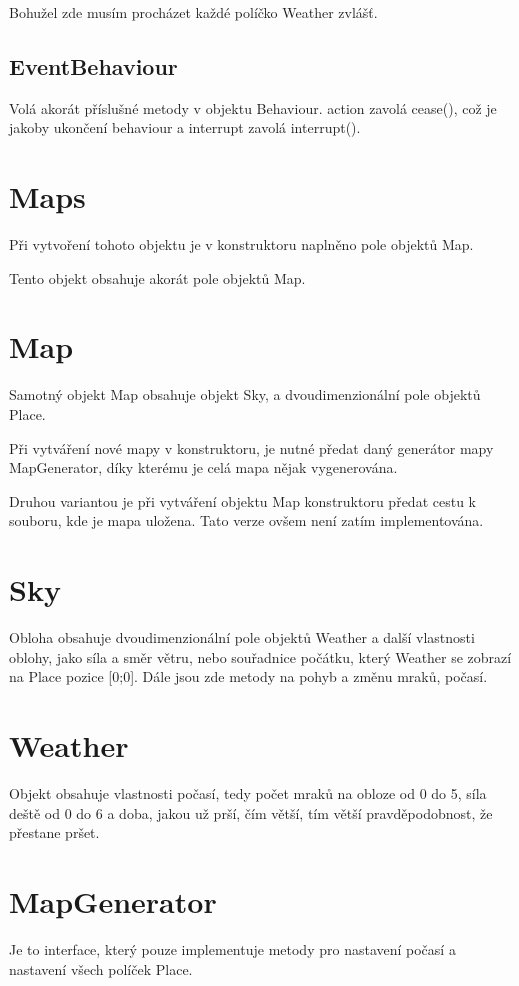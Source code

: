 \documentclass[12pt,a4paper]{report}
\begin{document}
Bohužel zde musím procházet každé políčko Weather zvlášť.

\subsection{EventBehaviour}
Volá akorát příslušné metody v objektu Behaviour. action zavolá cease(), což je jakoby ukončení behaviour a interrupt zavolá interrupt().


\section{Maps}
Při vytvoření tohoto objektu je v konstruktoru naplněno pole objektů Map.

Tento objekt obsahuje akorát pole objektů Map.

\section{Map}
 Samotný objekt Map obsahuje objekt Sky, a dvoudimenzionální pole objektů Place.  

Při vytváření nové mapy v konstruktoru, je nutné předat daný generátor mapy MapGenerator, díky kterému je celá mapa nějak vygenerována.

Druhou variantou je při vytváření objektu Map konstruktoru předat cestu k souboru, kde je mapa uložena. Tato verze ovšem není zatím implementována.
 
\section{Sky}
Obloha obsahuje dvoudimenzionální pole objektů Weather a další vlastnosti oblohy, jako síla a směr větru, nebo souřadnice počátku, který Weather se zobrazí na Place pozice [0;0]. Dále jsou zde metody na pohyb a změnu mraků, počasí.

\section{Weather}
Objekt obsahuje vlastnosti počasí, tedy počet mraků na obloze od 0 do 5, síla deště od 0 do 6 a doba, jakou už prší, čím větší, tím větší pravděpodobnost, že přestane pršet.

\section{MapGenerator}
Je to interface, který pouze implementuje metody pro nastavení počasí a nastavení všech políček Place.
\end{document}
